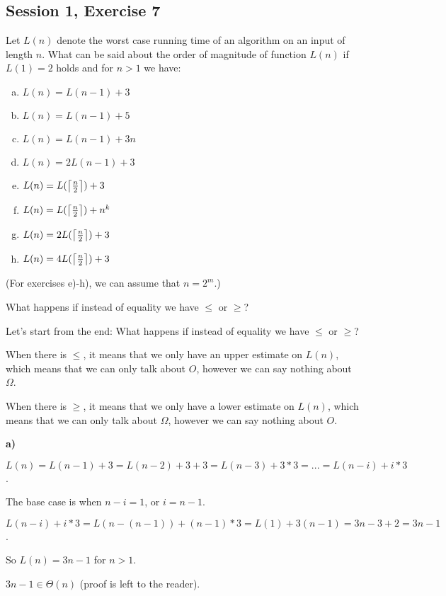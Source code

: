 \subsection{Session 1, Exercise 7}


Let $L(n)$ denote the worst case running time of an algorithm on an input of length $n$. What can be said about the order of magnitude of function $L(n)$ if $L(1) = 2$ holds and for $n>1$ we have:

\begin{enumerate}[a.)]
    \item $L(n) = L(n-1) + 3$
    \item $L(n) = L(n-1) + 5$
    \item $L(n) = L(n-1) + 3n$
    \item $L(n) = 2L(n-1) + 3$
    \item $L(n) = L(\ceil*{\frac{n}{2}}) + 3$
    \item $L(n) = L(\ceil*{\frac{n}{2}}) + n^k$
    \item $L(n) = 2L(\ceil*{\frac{n}{2}}) + 3$
    \item $L(n) = 4L(\ceil*{\frac{n}{2}}) + 3$
\end{enumerate}

(For exercises e)-h), we can assume that $n=2^m$.)

What happens if instead of equality we have $\leq{}$ or $\geq{}$?


Let's start from the end: What happens if instead of equality we have $\leq{}$ or $\geq{}$?

When there is $\leq{}$, it means that we only have an upper estimate on $L(n)$, which means that we can only talk about $O$, however we can say nothing about $\Omega$.

When there is $\geq{}$, it means that we only have a lower estimate on $L(n)$, which means that we can only talk about $\Omega$, however we can say nothing about $O$.

\textbf{a)}

$L(n) = L(n-1) + 3 = L(n-2) + 3 + 3 = L(n-3) + 3*3 = ... = L(n-i) + i*3$.

The base case is when $n-i=1$, or $i=n-1$.

$ L(n-i) + i*3 = L(n-(n-1)) + (n-1)*3 = L(1) + 3(n-1) = 3n - 3 + 2 = 3n-1$.

So $L(n) = 3n-1$ for $n>1$.

$3n-1 \in{} \Theta(n)$ (proof is left to the reader).

